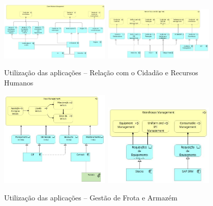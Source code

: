 \documentclass[12pt,a4paper,final]{article}
\begin{document}
    \begin{figure}[H]
        \centering
        \includegraphics[width=0.47\textwidth]{Q10 - Application Usage - Citzen Relations Management.jpg}
        \includegraphics[width=0.47\textwidth]{Q10 - Application Usage - Human Ressources Management.jpg}
        \caption{Utilização das aplicações – Relação com o Cidadão e Recursos Humanos}
        \label{fig:q10-usage-cidadao-rh}
    \end{figure}

    \begin{figure}[H]
        \centering
        \includegraphics[width=0.47\textwidth]{Q10 - Application Usage - Fleet Management.jpg}
        \includegraphics[width=0.47\textwidth]{Q10 - Application Usage - Warehouse Management.jpg}
        \caption{Utilização das aplicações – Gestão de Frota e Armazém}
        \label{fig:q10-usage-frota-armazem}
    \end{figure}
\end{document}
